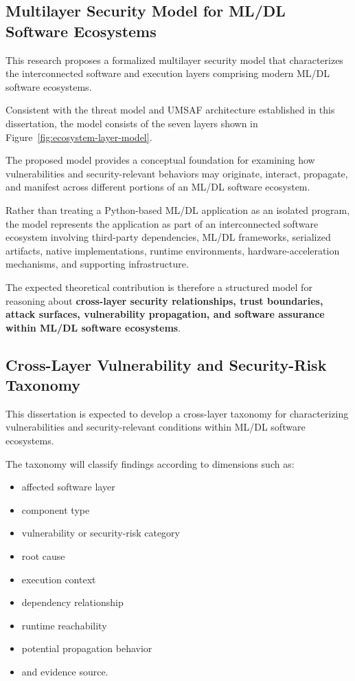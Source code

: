 \documentclass[
  12pt,
  letterpaper,
  oneside]{report}
\providecommand{\tightlist}{%
  \setlength{\itemsep}{0pt}\setlength{\parskip}{0pt}}
\begin{document}
\subsection{Multilayer Security Model for ML/DL Software Ecosystems}\label{1211-multilayer-security-model-for-mldl-software-ecosystems}

This research proposes a formalized multilayer security model that
characterizes the interconnected software and execution layers
comprising modern ML/DL software ecosystems.

Consistent with the threat model and UMSAF architecture established in
this dissertation, the model consists of the seven layers shown in
Figure~\ref{fig:ecosystem-layer-model}.

The proposed model provides a conceptual foundation for examining how
vulnerabilities and security-relevant behaviors may originate, interact,
propagate, and manifest across different portions of an ML/DL software
ecosystem.

Rather than treating a Python-based ML/DL application as an isolated
program, the model represents the application as part of an
interconnected software ecosystem involving third-party dependencies,
ML/DL frameworks, serialized artifacts, native implementations, runtime
environments, hardware-acceleration mechanisms, and supporting
infrastructure.

The expected theoretical contribution is therefore a structured model
for reasoning about \textbf{cross-layer security relationships, trust
boundaries, attack surfaces, vulnerability propagation, and software
assurance within ML/DL software ecosystems}.

\subsection{Cross-Layer Vulnerability and Security-Risk Taxonomy}\label{1212-cross-layer-vulnerability-and-security-risk-taxonomy}

This dissertation is expected to develop a cross-layer taxonomy for
characterizing vulnerabilities and security-relevant conditions within
ML/DL software ecosystems.

The taxonomy will classify findings according to dimensions such as:

\begin{itemize}
\tightlist
\item
  affected software layer
\item
  component type
\item
  vulnerability or security-risk category
\item
  root cause
\item
  execution context
\item
  dependency relationship
\item
  runtime reachability
\item
  potential propagation behavior
\item
  and evidence source.
\end{itemize}
\end{document}
